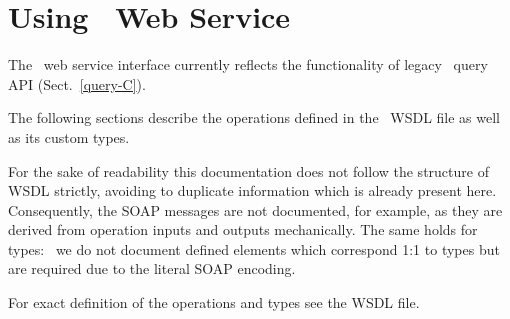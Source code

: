 
\section{Using \LB\ Web Service}



The \LB\ web service interface currently reflects the functionality of legacy
\LB\ query API (Sect.~\ref{query-C}).

The following sections describe the operations defined in the \LB\ WSDL
file as well as its custom types.

For the sake of readability this documentation does not follow the structure
of WSDL strictly, avoiding to duplicate information which is already present
here.
Consequently, the SOAP messages are not documented, for example, as they
are derived from operation inputs and outputs mechanically.
The same holds for types: \eg\ we do not document defined elements
which correspond 1:1 to types but are required due to the literal SOAP
encoding.

For exact definition of the operations and types see the WSDL file.

